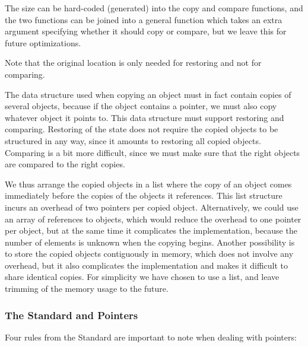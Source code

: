 \begin{docpart}
The size can be hard-coded (generated) into the copy and compare
functions, and the two functions can be joined into a general function
which takes an extra argument specifying whether it should copy or
compare, but we leave this for future optimizations.

Note that the original location is only needed for restoring
and not for comparing.

The data structure used when copying an object must in fact contain
copies of several objects, because if the object contains a pointer,
we must also copy whatever object it points to. This data structure must
support restoring and comparing. Restoring of the state does not
require the copied objects to be structured in any way, since it
amounts to restoring all copied objects. Comparing is a bit more
difficult, since we must make sure that the right objects are compared
to the right copies.

We thus arrange the copied objects in a list where the copy of an
object comes immediately before the copies of the objects it
references. This list structure incurs an overhead of two pointers per
copied object. Alternatively, we could use an array of references to
objects, which would reduce the overhead to one pointer per object,
but at the same time it complicates the implementation, because the
number of elements is unknown when the copying begins. Another
possibility is to store the copied objects contiguously in memory,
which does not involve any overhead, but it also complicates the
implementation and makes it difficult to share identical copies. For
simplicity we have chosen to use a list, and leave trimming of the
memory usage to the future.

\subsubsection{The Standard and Pointers} Four rules from the Standard
are important to note when dealing with pointers:


\end{docpart}
